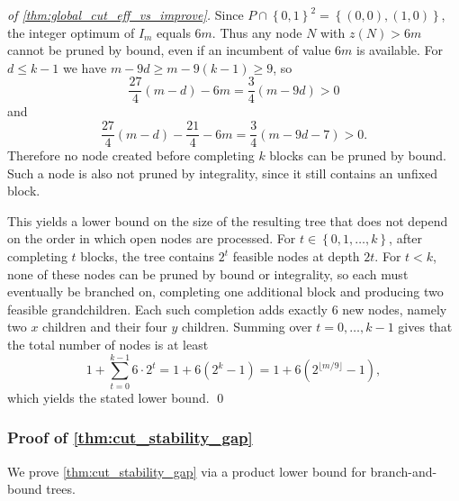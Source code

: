 \documentclass[smallextended,envcountsect]{svjour3} %
\newcommand{\set}[1]{\left\{#1\right\}}
\newcommand{\0}{\mathbf{0}}
\newcommand{\1}{\mathbf{1}} %
\begin{document}
\begin{proof}[of \cref{thm:global_cut_eff_vs_improve}]
	Since $P\cap\set{0,1}^2=\set{(0,0),(1,0)}$, the integer optimum of $I_m$ equals $6m$.
	Thus any node $N$ with $z(N)>6m$ cannot be pruned by bound, even if an incumbent of value $6m$ is available.
	For $d\le k-1$ we have $m-9d\ge m-9(k-1)\ge 9$, so
	\[
		\frac{27}{4}(m-d)-6m=\frac{3}{4}(m-9d)>0
	\]
	and
	\[
			\frac{27}{4}(m-d)-\frac{21}{4}-6m=\frac{3}{4}(m-9d-7)>0.
		\]
			Therefore no node created before completing $k$ blocks can be pruned by bound.
			Such a node is also not pruned by integrality, since it still contains an unfixed block.
	
	
	
		This yields a lower bound on the size of the resulting tree that does not depend on the order in which open nodes are processed.
		For $t\in\set{0,1,\dots,k}$, after completing $t$ blocks, the tree contains $2^t$ feasible nodes at depth $2t$.
		For $t<k$, none of these nodes can be pruned by bound or integrality, so each must eventually be branched on, completing one additional block and producing two feasible grandchildren.
		Each such completion adds exactly $6$ new nodes, namely two $x$ children and their four $y$ children.
		Summing over $t=0,\dots,k-1$ gives that the total number of nodes is at least
	    \[
			1+\sum_{t=0}^{k-1} 6\cdot 2^t = 1+6\left(2^k-1\right) = 1+6\left(2^{\lfloor m/9\rfloor}-1\right),
		\]
		which yields the stated lower bound.
\qed
\end{proof}

\subsubsection{Proof of \cref{thm:cut_stability_gap}}\label{sec:cut_stability_gap}
We prove \cref{thm:cut_stability_gap} via a product lower bound for branch-and-bound trees.
\end{document}
